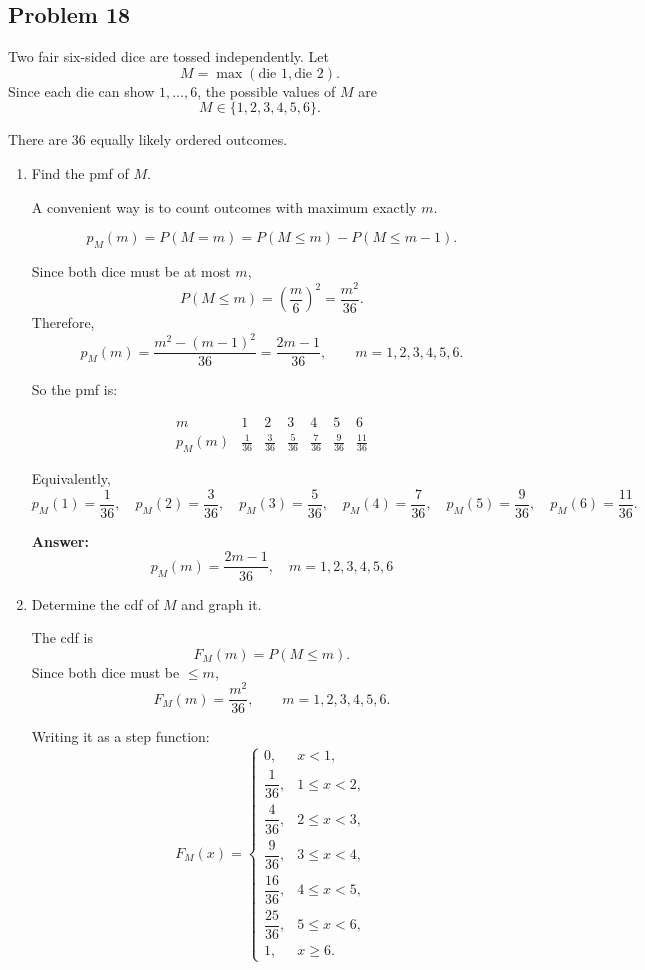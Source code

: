 \documentclass[11pt]{article}
\begin{document}
\subsection*{Problem 18}

Two fair six-sided dice are tossed independently. Let
\[
M=\max(\text{die 1},\text{die 2}).
\]
Since each die can show \(1,\dots,6\), the possible values of \(M\) are
\[
M \in \{1,2,3,4,5,6\}.
\]

There are \(36\) equally likely ordered outcomes.

\begin{enumerate}
    \item[(a)] Find the pmf of \(M\).

    A convenient way is to count outcomes with maximum exactly \(m\).

    \[
    p_M(m)=P(M=m)=P(M\le m)-P(M\le m-1).
    \]

    Since both dice must be at most \(m\),
    \[
    P(M\le m)=\left(\frac{m}{6}\right)^2=\frac{m^2}{36}.
    \]
    Therefore,
    \[
    p_M(m)=\frac{m^2-(m-1)^2}{36}
    =\frac{2m-1}{36}, \qquad m=1,2,3,4,5,6.
    \]

    So the pmf is:

    \[
    \begin{array}{c|cccccc}
    m & 1 & 2 & 3 & 4 & 5 & 6 \\ \hline
    p_M(m) & \frac{1}{36} & \frac{3}{36} & \frac{5}{36} & \frac{7}{36} & \frac{9}{36} & \frac{11}{36}
    \end{array}
    \]

    Equivalently,
    \[
    p_M(1)=\frac{1}{36},\quad
    p_M(2)=\frac{3}{36},\quad
    p_M(3)=\frac{5}{36},\quad
    p_M(4)=\frac{7}{36},\quad
    p_M(5)=\frac{9}{36},\quad
    p_M(6)=\frac{11}{36}.
    \]

    \textbf{Answer:}
    \[
    \boxed{p_M(m)=\frac{2m-1}{36}, \quad m=1,2,3,4,5,6}
    \]

    \item[(b)] Determine the cdf of \(M\) and graph it.

    The cdf is
    \[
    F_M(m)=P(M\le m).
    \]
    Since both dice must be \(\le m\),
    \[
    F_M(m)=\frac{m^2}{36}, \qquad m=1,2,3,4,5,6.
    \]

    Writing it as a step function:
    \[
    F_M(x)=
    \begin{cases}
    0, & x<1,\\[4pt]
    \dfrac{1}{36}, & 1\le x<2,\\[6pt]
    \dfrac{4}{36}, & 2\le x<3,\\[6pt]
    \dfrac{9}{36}, & 3\le x<4,\\[6pt]
    \dfrac{16}{36}, & 4\le x<5,\\[6pt]
    \dfrac{25}{36}, & 5\le x<6,\\[6pt]
    1, & x\ge 6.
    \end{cases}
    \]


\end{enumerate}
\end{document}
